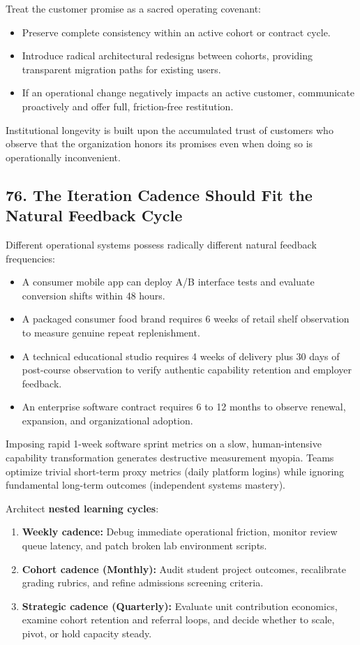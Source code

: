 Treat the customer promise as a sacred operating covenant:
\begin{itemize}
    \item Preserve complete consistency within an active cohort or contract cycle.
    \item Introduce radical architectural redesigns between cohorts, providing transparent migration paths for existing users.
    \item If an operational change negatively impacts an active customer, communicate proactively and offer full, friction-free restitution.
\end{itemize}

Institutional longevity is built upon the accumulated trust of customers who observe that the organization honors its promises even when doing so is operationally inconvenient.

\subsection*{76. The Iteration Cadence Should Fit the Natural Feedback Cycle}

Different operational systems possess radically different natural feedback frequencies:
\begin{itemize}
    \item A consumer mobile app can deploy A/B interface tests and evaluate conversion shifts within 48 hours.
    \item A packaged consumer food brand requires 6 weeks of retail shelf observation to measure genuine repeat replenishment.
    \item A technical educational studio requires 4 weeks of delivery plus 30 days of post-course observation to verify authentic capability retention and employer feedback.
    \item An enterprise software contract requires 6 to 12 months to observe renewal, expansion, and organizational adoption.
\end{itemize}

Imposing rapid 1-week software sprint metrics on a slow, human-intensive capability transformation generates destructive measurement myopia. Teams optimize trivial short-term proxy metrics (daily platform logins) while ignoring fundamental long-term outcomes (independent systems mastery).

Architect \textbf{nested learning cycles}:
\begin{enumerate}
    \item \textbf{Weekly cadence:} Debug immediate operational friction, monitor review queue latency, and patch broken lab environment scripts.
    \item \textbf{Cohort cadence (Monthly):} Audit student project outcomes, recalibrate grading rubrics, and refine admissions screening criteria.
    \item \textbf{Strategic cadence (Quarterly):} Evaluate unit contribution economics, examine cohort retention and referral loops, and decide whether to scale, pivot, or hold capacity steady.
\end{enumerate}
